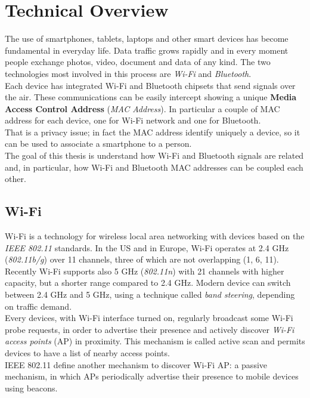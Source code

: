\chapter{Technical Overview}
\thispagestyle{empty}

The use of smartphones, tablets, laptops and other smart devices has become fundamental in everyday life. Data traffic grows rapidly and in every moment people exchange photos, video, document and data of any kind. The two technologies most involved in this process are \textit{Wi-Fi} and \textit{Bluetooth}.\\
\linebreak
Each device has integrated Wi-Fi and Bluetooth chipsets that send signals over the air. These communications can be easily intercept showing a unique \textbf{Media Access Control Address} (\textit{MAC Address}). In particular a couple of MAC address for each device, one for Wi-Fi network and one for Bluetooth. \\
That is a privacy issue; in fact the MAC address identify uniquely a device, so it can be used to associate a smartphone to a person.\\
\linebreak
The goal of this thesis is understand how Wi-Fi and Bluetooth signals are related and, in particular, how Wi-Fi and Bluetooth MAC addresses can be coupled each other.

\section{Wi-Fi}
Wi-Fi is a technology for wireless local area networking with devices based on the \textit{IEEE 802.11} standards. In the US and in Europe, Wi-Fi operates at 2.4 GHz (\textit{802.11b/g}) over 11 channels, three of which are not overlapping (1, 6, 11).\\
Recently Wi-Fi supports also 5 GHz (\textit{802.11n}) with 21 channels with higher capacity, but a shorter range compared to 2.4 GHz. Modern device can switch between 2.4 GHz and 5 GHz, using a technique called \textit{band steering}, depending on traffic demand.\\
\linebreak
Every devices, with Wi-Fi interface turned on, regularly broadcast some Wi-Fi probe requests, in order to advertise their presence and actively discover \textit{Wi-Fi access points} (AP) in proximity. This mechanism is called active scan and permits devices to have a list of nearby access points. \\
IEEE 802.11 define another mechanism to discover Wi-Fi AP: a passive mechanism, in which APs periodically advertise their presence to mobile devices using beacons.
